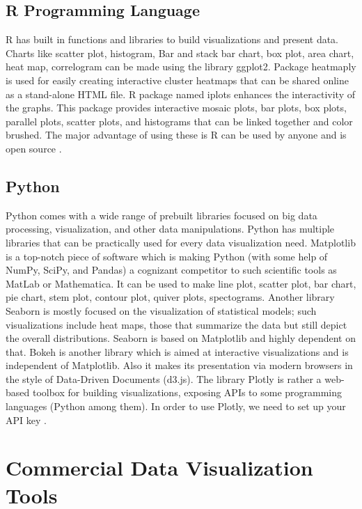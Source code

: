 \subsection{R Programming Language }

R has built in functions and libraries to build visualizations and present data. Charts like scatter plot, histogram, Bar and stack bar chart, box plot, area chart, heat map, correlogram can be made using the library ggplot2. Package heatmaply is used for easily creating interactive cluster heatmaps that can be shared online as a stand-alone HTML file. R package named iplots enhances the interactivity of the graphs. This package provides interactive mosaic plots, bar plots, box plots, parallel plots, scatter plots, and histograms that can be linked together and color brushed. The major advantage of using these is R can be used by anyone and is open source \cite{R}.

\subsection{Python}

Python comes with a wide range of prebuilt libraries focused on big data processing, visualization, and other data manipulations. Python has multiple libraries that can be practically used for every data visualization need. Matplotlib is a top-notch piece of software which is making Python (with some help of NumPy, SciPy, and Pandas) a cognizant competitor to such scientific tools as MatLab or Mathematica. It can be used to make line plot, scatter plot, bar chart, pie chart, stem plot, contour plot, quiver plots, spectograms. Another library Seaborn is mostly focused on the visualization of statistical models; such visualizations include heat maps, those that summarize the data but still depict the overall distributions. Seaborn is based on Matplotlib and highly dependent on that. Bokeh is another library which is aimed at interactive visualizations and is independent of Matplotlib. Also it makes its presentation via modern browsers in the style of Data-Driven Documents (d3.js). The library Plotly is rather a web-based toolbox for building visualizations, exposing APIs to some programming languages (Python among them). In order to use Plotly, we need to set up your API key \cite{Python}. 

\section{Commercial Data Visualization Tools}

